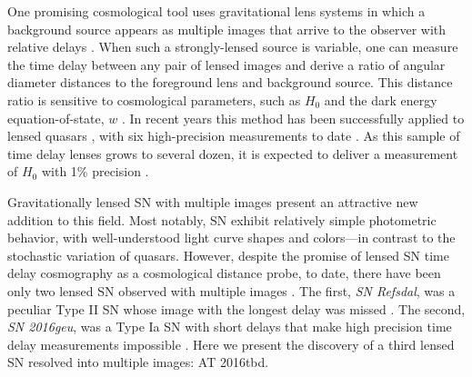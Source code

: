 \documentclass[12pt]{article}
\def\SNABC{AT 2016tbd\xspace}
\begin{document}
One promising cosmological tool uses %
gravitational lens systems in which a background
source appears as multiple images that arrive to the observer with relative delays \cite{einstein_lens_1936}.
When such a strongly-lensed source is variable, one can measure the time delay between any pair of lensed images and derive a ratio of angular diameter distances to the foreground lens and background source. 
This distance ratio is sensitive to cosmological parameters, such as 
$H_0$  and the dark energy equation-of-state, $w$ \cite{refsdal_possibility_1964,coe_cosmological_2009,linder_lensing_2011}.
In recent years this method has been successfully applied to lensed
quasars \cite{suyu_cosmology_2014,bonvin_cosmograil_2019}, with six high-precision measurements to date \cite{wong_h0licow_2019}. As this sample of time delay lenses grows to several dozen, it is expected to deliver a measurement of $H_0$ with 1\% precision \cite{suyu_cosmological_2018}. 

Gravitationally lensed SN with multiple images present an attractive new addition to this field. Most notably, SN exhibit relatively simple photometric behavior, with well-understood light curve shapes and colors---in contrast to the stochastic variation of quasars.  However, despite the promise of lensed SN time delay cosmography as a cosmological distance probe, to date, there have been only two lensed SN observed with multiple images \cite{kelly_multiple_2015,goobar_iptf16geu:_2017}. The first, {\it SN Refsdal}, was a peculiar Type II SN whose image with the longest delay was missed \cite{kelly_sn_2016}. The second, {\it SN 2016geu}, was a Type Ia SN with short delays that make high precision time delay measurements impossible \cite{dhawan_magnification_2019}.   Here we present the discovery 
of a third lensed SN resolved into multiple images: \SNABC. 
\end{document}
